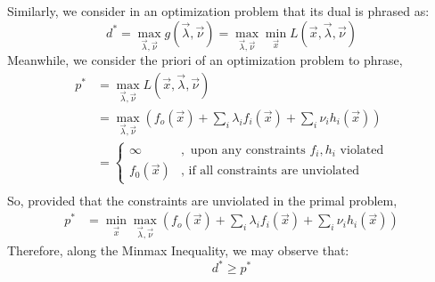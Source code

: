 Similarly, we consider in an optimization problem that its dual is phrased as:
\[
    d^* = \max_{\vec{\lambda}, \vec{\nu}} g(\vec{\lambda}, \vec{\nu}) = \max_{\vec{\lambda}, \vec{\nu}} \min_{\vec{x}} L(\vec{x}, \vec{\lambda}, \vec{\nu})
\]
Meanwhile, we consider the priori of an optimization problem to phrase,
\begin{align*}
    p^* &= \max_{\vec{\lambda}, \vec{\nu}} L(\vec{x}, \vec{\lambda}, \vec{\nu}) \\
    &= \max_{\vec{\lambda}, \vec{\nu}} (f_o(\vec{x}) + \sum_i \lambda_i f_i(\vec{x}) + \sum_i \nu_i h_i (\vec{x})) \\
    &= \begin{cases}
        \infty &,\text{ upon any constraints $f_i, h_i$ violated} \\
        f_0(\vec{x}) &,\text{ if all constraints are unviolated}
    \end{cases} \\
\end{align*}
So, provided that the constraints are unviolated in the primal problem,
\begin{align*}
    p^* &= \min_{\vec{x}} \max_{\vec{\lambda}, \vec{\nu}} (f_o(\vec{x}) + \sum_i \lambda_i f_i(\vec{x}) + \sum_i \nu_i h_i (\vec{x}))
\end{align*}
Therefore, along the Minmax Inequality, we may observe that:
\[
    d^* \geq p^*
\]
